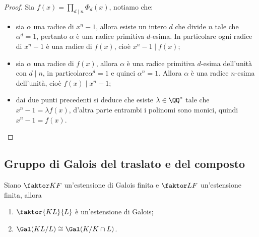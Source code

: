 \documentclass[11pt]{scrartcl}
\begin{document}
\begin{proof}
    Sia $f(x) = \displaystyle\prod_{d \mid n}\Phi_d(x)$, notiamo che:
    \begin{itemize}
        \item sia $\alpha$ una radice di $x^n - 1$, allora esiste un intero $d$
        che divide $n$ tale che $\alpha^d = 1$, pertanto $\alpha$ è una radice primitiva
        $d$-esima. In particolare ogni radice di $x^n - 1$ è una radice di 
        $f(x)$, cioè $x^n - 1 \mid f(x)$;
        \item sia $\alpha$ una radice di $f(x)$, allora $\alpha$ è una radice
        primitiva $d$-esima dell'unità con $d\mid n$, in particolare$\alpha^d = 1$
        e quinci $\alpha^n = 1$. Allora $\alpha$ è una radice $n$-esima dell'unità,
        cioè $f(x) \mid x^n - 1$;
        \item dai due punti precedenti si deduce che esiste $\lambda \in \QQ^*$
        tale che $x^n - 1 = \lambda f(x)$, d'altra parte entrambi i polinomi
        sono monici, quindi $x^n - 1 = f(x)$.
    \end{itemize}
\end{proof}

\newpage

\subsection{Gruppo di Galois del traslato e del composto}

\begin{proposition}
    \label{prop3.13}
    Siano $\faktor K F$ un'estensione di Galois finita e $\faktor L F$ un'estensione
    finita, allora
    \begin{enumerate}[(1)]
        \item $\faktor{KL}{L}$ è un'estensione di Galois;
        \item $\Gal(KL/L) \cong \Gal(K/K\cap L)$.
    \end{enumerate}
\end{proposition}
\end{document}
